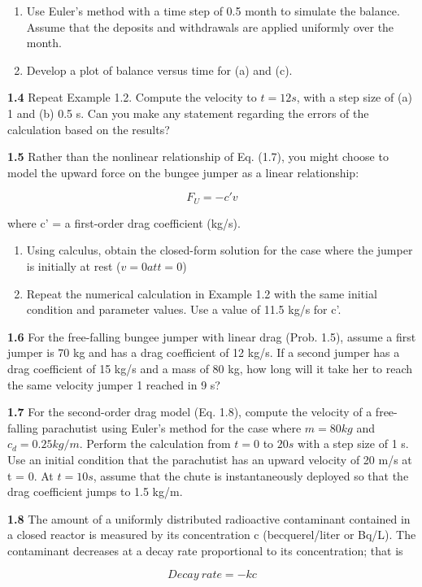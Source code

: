 \documentclass[../main.tex]{subfiles}
\begin{document}
\begin{multicols}{2}
\begin{enumerate}[label=(\alph*)]
\item Use Euler's method with a time step of 0.5 month to
simulate the balance. Assume that the deposits and withdrawals are applied uniformly over the month. 
\item Develop a plot of balance versus time for (a) and (c).
\end{enumerate}


\textbf{1.4} Repeat Example 1.2. Compute the velocity to $t = 12 s$,
with a step size of (a) 1 and (b) 0.5 s. Can you make any
statement regarding the errors of the calculation based on the
results?

\textbf{1.5} Rather than the nonlinear relationship of Eq. (1.7), you
might choose to model the upward force on the bungee
jumper as a linear relationship:

$$F_U = -c'v$$

where c' = a first-order drag coefficient (kg/s). 
\begin{enumerate}[label=(\alph*)]
	\item Using calculus, obtain the closed-form solution for the
	case where the jumper is initially at rest ($v = 0 at t = 0$)
	\item Repeat the numerical calculation in Example 1.2 with
	the same initial condition and parameter values. Use a
	value of 11.5 kg/s for c'.
\end{enumerate}

\textbf{1.6} For the free-falling bungee jumper with linear drag
(Prob. 1.5), assume a first jumper is 70 kg and has a drag coefficient of 12 kg/s. If a second jumper has a drag coefficient
of 15 kg/s and a mass of 80 kg, how long will it take her to
reach the same velocity jumper 1 reached in 9 s?


\textbf{1.7} For the second-order drag model (Eq. 1.8), compute the
velocity of a free-falling parachutist using Euler's method
for the case where $m = 80 kg$ and $c_d = 0.25 kg/m$. Perform
the calculation from $t = 0$ to $20 s$ with a step size of 1 s. Use
an initial condition that the parachutist has an upward velocity of 
20 m/s at t = 0. At $t = 10 s$, assume that the chute is
instantaneously deployed so that the drag coefficient jumps
to 1.5 kg/m.

\textbf{1.8} The amount of a uniformly distributed radioactive contaminant contained in a closed reactor is measured by its
concentration c (becquerel/liter or Bq/L). The contaminant
decreases at a decay rate proportional to its concentration;
that is

$$ Decay\ rate =  -kc $$


\end{multicols}
\end{document}
